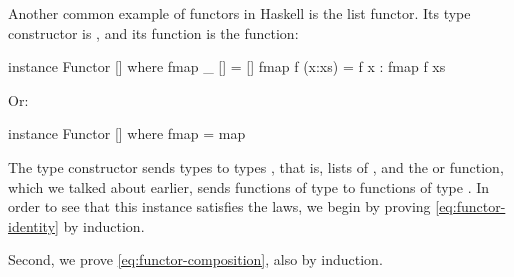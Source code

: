 \begin{example}
  \label{ex:functor-list-haskell}


  Another common example of functors in Haskell is the list functor.
  Its type constructor is \texthaskell{[]}, and its 
  function is the  function:
  \begin{codehaskell}
instance Functor [] where
  fmap _ []     = []
  fmap f (x:xs) = f x : fmap f xs
  \end{codehaskell}
  Or:
  \begin{codehaskell}
instance Functor [] where
  fmap = map
  \end{codehaskell}
  The \texthaskell{[]} type constructor sends types  to
  types \texthaskell{[a]}, that is, lists of , and the
   or  function, which we talked
  about earlier, sends functions of type  to
  functions of type \texthaskell{[a] -> [b]}. In order to see that
  this instance satisfies the laws, we begin by proving
  \eqref{eq:functor-identity} by induction.

  \vspace{1em}
  \case{\texthaskell{[]}}
  \begin{steps}
    \steph{[]}
  \end{steps}
  \begin{steps}
      \eqbyihh{}
  \end{steps}
  Second, we prove \eqref{eq:functor-composition}, also by induction.

  \vspace{1em}
  \case{\texthaskell{[]}}
  \begin{steps}
    \steph{[]}
  \end{steps}
  \begin{steps}
      \eqbyihh{}
  \end{steps}

\end{example}

